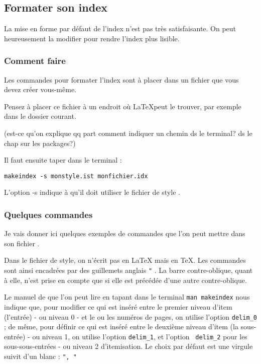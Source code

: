 \subsection{Formater son index}

La mise en forme par défaut de l'index n'est pas très satisfaisante. On peut heureusement la modifier pour rendre l'index plus lisible.


\subsubsection{Comment faire}
Les commandes pour formater l'index sont à placer dans un fichier  que vous devez créer vous-même.

\begin{attention}
Pensez à placer ce fichier à un endroit où \LaTeX peut le trouver, par exemple dans le dossier courant.

(est-ce qu'on explique qq part comment indiquer un chemin ds le terminal? ds le chap sur les packages?)
\end{attention}

Il faut ensuite taper dans le terminal :
\begin{verbatim}
makeindex -s monstyle.ist monfichier.idx
\end{verbatim}

L'option -s indique à   qu'il doit utiliser le fichier de style  .

\subsubsection{Quelques commandes}

Je vais donner ici quelques exemples de commandes que l'on peut mettre dans son fichier . 

\begin{attention}
Dans le fichier de style, on n'écrit pas en \LaTeX{} mais en \TeX . Les commandes sont ainsi encadrées par des guillemets anglais \verb|"| . La barre contre-oblique, quant à elle, n'est prise en compte que si elle est précédée d'une autre contre-oblique.
\end{attention}

Le manuel de  que l'on peut lire en tapant dans le terminal \verb+man makeindex+ nous indique que, pour modifier ce qui est inséré entre le premier niveau d'item (l'entrée) - ou niveau 0 -  et le ou les numéros de pages, on utilise l'option \verb|delim_0| ; de même, pour définir ce qui est inséré entre le deuxième niveau d'item (la sous-entrée) - ou niveau 1, on utilise l'option \verb+delim_1+, et l'option \verb| delim_2| pour les sous-sous-entrées - ou niveau 2 d'itemisation. Le choix par défaut est une virgule suivit d'un blanc : \verb|", "|

